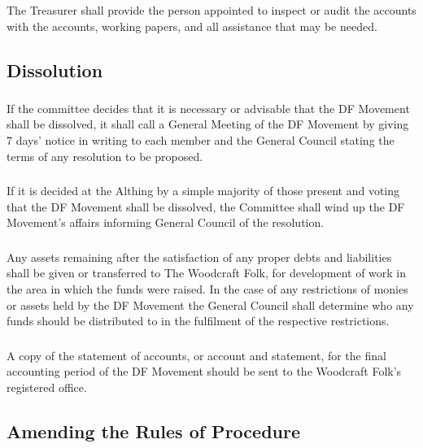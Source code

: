 \documentclass[a4paper, 12pt]{report}
\begin{document}
\subsubsection{}
The Treasurer shall provide the person appointed to inspect or audit the accounts with the accounts, working papers, and all assistance that may be needed.

\subsection{Dissolution}
\subsubsection{}
If the committee decides that it is necessary or advisable that the DF Movement shall be dissolved, it shall call a General Meeting of the DF Movement by giving 7 days' notice in writing to each member and the General Council stating the terms of any resolution to be proposed.
\subsubsection{}
If it is decided at the Althing by a simple majority of those present and voting that the DF Movement shall be dissolved, the Committee shall wind up the DF Movement's affairs informing General Council of the resolution.
\subsubsection{}
Any assets remaining after the satisfaction of any proper debts and liabilities shall be given or transferred to The Woodcraft Folk, for development of work in the area in which the funds were raised. In the case of any restrictions of monies or assets held by the DF Movement the General Council shall determine who any funds should be distributed to in the fulfilment of the respective restrictions.
\subsubsection{}
A copy of the statement of accounts, or account and statement, for the final accounting period of the DF Movement should be sent to the Woodcraft Folk's registered office.

\subsection{Amending the Rules of Procedure}
\end{document}
